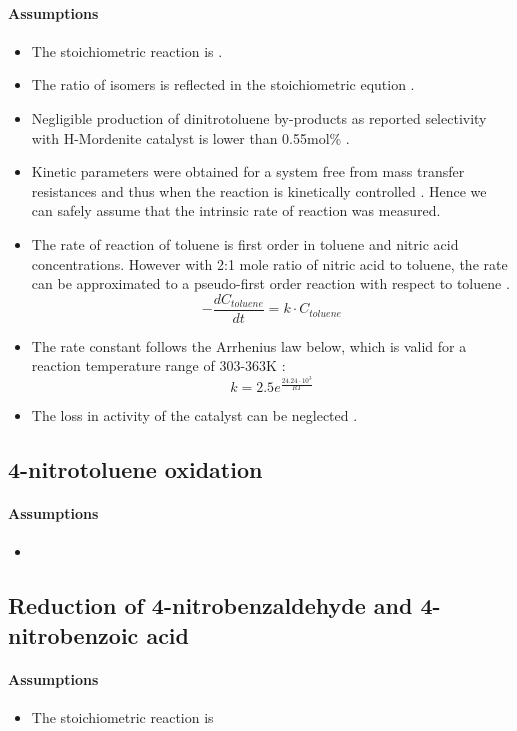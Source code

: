 \paragraph{Assumptions}
\begin{itemize}
    \item The stoichiometric reaction is .
    \item The ratio of isomers is reflected in the stoichiometric eqution \cite{smith_novel_1998}.
    \item Negligible production of dinitrotoluene by-products as reported selectivity with H-Mordenite catalyst is lower than 0.55mol\% \cite{jeeru_kinetics_2018}.
    \item Kinetic parameters were obtained for a system free from mass transfer resistances and thus when the reaction is kinetically controlled \cite{jeeru_kinetics_2018}. Hence we can safely assume that the intrinsic rate of reaction was measured.
    \item The rate of reaction of toluene is first order in toluene and nitric acid concentrations. However with 2:1 mole ratio of nitric acid to toluene, the rate can be approximated to a pseudo-first order reaction with respect to toluene \cite{jeeru_kinetics_2018}.
    \begin{equation}
    - \frac{dC_{toluene}}{dt}=k \cdot C_{toluene} 
    \end{equation}
    \item The rate constant follows the Arrhenius law below, which is valid for a reaction temperature range of 303-363K \cite{jeeru_kinetics_2018}:
    \begin{equation}
        k=2.5e^{\frac{24.24\cdot 10^{3}}{RT}}
    \end{equation}
    \item The loss in activity of the catalyst can be neglected \cite{jeeru_kinetics_2018}.
\end{itemize}

\subsection{4-nitrotoluene oxidation}
\paragraph{Assumptions}
\begin{itemize}
    \item 
\end{itemize}

\subsection{Reduction of 4-nitrobenzaldehyde and 4-nitrobenzoic acid}
\paragraph{Assumptions}
\begin{itemize}
    \item The stoichiometric reaction is 
\end{itemize}
